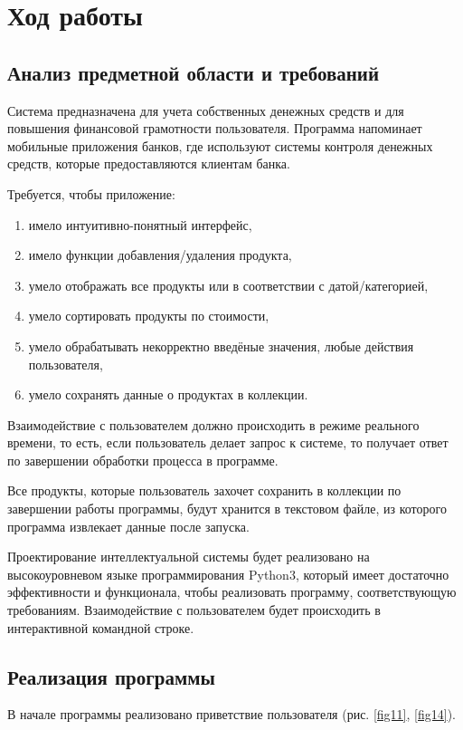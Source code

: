 \documentclass[14pt]{extreport}
\begin{document}
\chapter{Ход работы}

\section{Анализ предметной области и требований}

Система предназначена для учета собственных денежных средств и для повышения финансовой грамотности пользователя. Программа напоминает мобильные приложения банков, где используют системы контроля денежных средств, которые предоставляются клиентам банка. 

Требуется, чтобы приложение:
\begin{enumerate}
\item имело интуитивно-понятный интерфейс,
\item имело функции добавления/удаления продукта,
\item умело отображать все продукты или в соответствии с датой/категорией,
\item умело сортировать продукты по стоимости,
\item умело обрабатывать некорректно введёные значения, любые действия пользователя,
\item умело сохранять данные о продуктах в коллекции.
\end{enumerate}

Взаимодействие с пользователем должно происходить в режиме реального времени, то есть, если пользователь делает запрос к системе, то получает ответ по завершении обработки процесса в программе.

Все продукты, которые пользователь захочет сохранить в коллекции по завершении работы программы, будут хранится в текстовом файле, из которого программа извлекает данные после запуска.

Проектирование интеллектуальной системы будет реализовано на высокоуровневом языке программирования Python3, который имеет достаточно эффективности и функционала, чтобы реализовать программу, соответствующую требованиям. Взаимодействие с пользователем будет происходить в интерактивной командной строке.

\section{Реализация программы}

В начале программы реализовано приветствие пользователя (рис. \ref{fig11}, \ref{fig14}).
\end{document}
